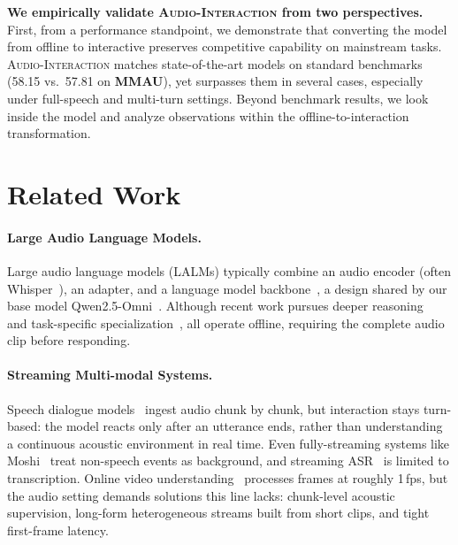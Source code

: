 \documentclass{llmxive}
\begin{document}
\vspace{1mm}
\textbf{We empirically validate \textsc{Audio-Interaction} from two perspectives.} First, from a performance standpoint, we demonstrate that converting the model from offline to interactive preserves competitive capability on mainstream tasks. \textsc{Audio-Interaction} matches state-of-the-art models on standard benchmarks (58.15 vs.\ 57.81 on \textbf{MMAU}), yet surpasses them in several cases, especially under full-speech and multi-turn settings. Beyond benchmark results, we look inside the model and analyze observations within the offline-to-interaction transformation.

\section{Related Work}
\label{sec:related_work}
\vspace{-2mm}

\paragraph{Large Audio Language Models.}
Large audio language models (LALMs) typically combine an audio encoder (often Whisper~\citep{radford2023whisper}), an adapter, and a language model backbone~\citep{chu2024qwen2, tang2023salmonn, qwen25omni2025}, a design shared by our base model Qwen2.5-Omni~\citep{qwen25omni2025}. Although recent work pursues deeper reasoning~\citep{goel2025audio} and task-specific specialization~\citep{xu2025fireredasr}, all operate offline, requiring the complete audio clip before responding.

\vspace{-2mm}

\paragraph{Streaming Multi-modal Systems.}
Speech dialogue models~\citep{xie2024mini, fang2024llama, fang2025llamaomni2, defossez2024moshi, qwen25omni2025} ingest audio chunk by chunk, but interaction stays turn-based: the model reacts only after an utterance ends, rather than understanding a continuous acoustic environment in real time. Even fully-streaming systems like Moshi~\citep{defossez2024moshi} treat non-speech events as background, and streaming ASR~\citep{gao2022paramformer} is limited to transcription. Online video understanding~\citep{li2025videochat, chen2024videollm} processes frames at roughly 1\,fps, but the audio setting demands solutions this line lacks: chunk-level acoustic supervision, long-form heterogeneous streams built from short clips, and tight first-frame latency.
\end{document}
